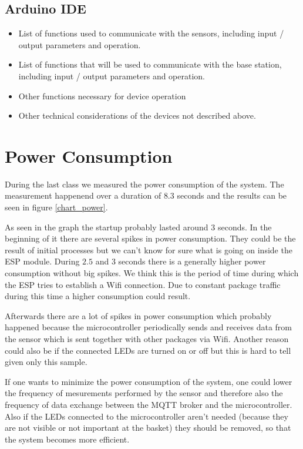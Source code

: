 \documentclass{article}
\begin{document}
\subsection{Arduino IDE}
\begin{itemize}
\item List of functions used to communicate with the sensors, including input / output parameters and operation.
	\item List of functions that will be used to communicate with the base station, including input / output parameters and operation. 
	\item Other functions necessary for device operation
	\item Other technical considerations of the devices not described above. 
\end{itemize}

\section{Power Consumption}
During the last class we measured the power consumption of the system. The measurement happenend over a duration of $8.3$ seconds and the results can be seen in figure \ref{chart_power}.\par 
As seen in the graph the startup probably lasted around 3 seconds. In the beginning of it there are several spikes in power consumption. They could be the result of initial processes but we can't know for sure what is going on inside the ESP module. During $2.5$ and $3$ seconds there is a generally higher power consumption without big spikes. We think this is the period of time during which the ESP tries to establish a Wifi connection. Due to constant package traffic during this time a higher consumption could result.\par 
Afterwards there are a lot of spikes in power consumption which probably happened because the microcontroller periodically sends and receives data from the sensor which is sent together with other packages via Wifi. Another reason could also be if the connected LEDs are turned on or off but this is hard to tell given only this sample.\par 
If one wants to minimize the power consumption of the system, one could lower the frequency of mesurements performed by the sensor and therefore also the frequency of data exchange between the MQTT broker and the microcontroller. Also if the LEDs connected to the microcontroller aren't needed (because they are not visible or not important at the basket) they should be removed, so that the system becomes more efficient.
\end{document}
